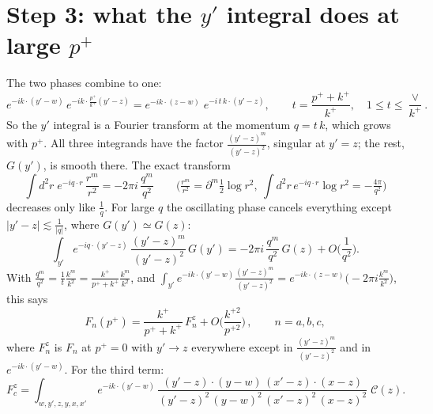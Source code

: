 \documentclass[10pt]{article}
\numberwithin{equation}{section}
\begin{document}
\section{Step 3: what the \texorpdfstring{$y'$}{y'} integral does at large \texorpdfstring{$p^+$}{p+}}
The two phases combine to one:
\begin{equation}
e^{-ik\cdot (y'-w)}\, e^{-ik\cdot \frac{p^{+}}{k^{+}}(y'-z)}=e^{-ik\cdot (z-w)}\;e^{-i\,t\,k\cdot(y'-z)},\qquad t=\frac{p^++k^+}{k^+},\quad 1\le t\le\frac{\vee}{k^+}.
\end{equation}
So the $y'$ integral is a Fourier transform at the momentum $q=t\,k$, which grows with $p^+$. All three integrands have the factor $\frac{(y'-z)^m}{(y'-z)^2}$, singular at $y'=z$; the rest, $G(y')$, is smooth there. The exact transform
\begin{equation}
\int d^2r\;e^{-iq\cdot r}\,\frac{r^m}{r^2}=-2\pi i\,\frac{q^m}{q^2}
\qquad\Big(\tfrac{r^m}{r^2}=\partial^m\tfrac12\log r^2,\ \int d^2r\,e^{-iq\cdot r}\log r^2=-\tfrac{4\pi}{q^2}\Big)
\label{eq:lemma0}
\end{equation}
decreases only like $\frac{1}{q}$. For large $q$ the oscillating phase cancels everything except $|y'-z|\lesssim\frac{1}{|q|}$, where $G(y')\simeq G(z)$:
\begin{equation}
\int_{y'}e^{-iq\cdot (y'-z)}\,\frac{(y'-z)^m}{(y'-z)^2}\,G(y')=-2\pi i\,\frac{q^m}{q^2}\,G(z)+O\Big(\frac{1}{q^2}\Big).
\label{eq:lemma}
\end{equation}
With $\frac{q^m}{q^2}=\frac1t\frac{k^m}{k^2}=\frac{k^+}{p^++k^+}\frac{k^m}{k^2}$, and $\int_{y'}e^{-ik\cdot(y'-w)}\frac{(y'-z)^m}{(y'-z)^2}=e^{-ik\cdot(z-w)}\big(-2\pi i\frac{k^m}{k^2}\big)$, this says
\begin{equation}
\boxed{F_n(p^+)=\frac{k^+}{p^++k^+}\,F_n^{z}+O\Big(\frac{k^{+2}}{p^{+2}}\Big)}\,,\qquad n=a,b,c,
\label{eq:Fz}
\end{equation}
where $F_n^z$ is $F_n$ at $p^+=0$ with $y'\to z$ everywhere except in $\frac{(y'-z)^m}{(y'-z)^2}$ and in $e^{-ik\cdot(y'-w)}$. For the third term:
\begin{equation}
F_c^{z}=\int_{w,y',z,y,x,x'}\, e^{-ik\cdot (y'-w)}\,\frac{(y'-z)\cdot (y-w)\,(x'-z)\cdot (x-z)}{(y'-z)^{2}\,(y-w)^{2}\,(x'-z)^{2}\,(x-z)^{2}}\;\mathcal C(z).
\label{eq:Fcz}
\end{equation}
\end{document}
